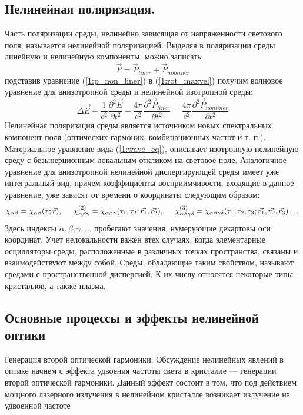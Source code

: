\subsection{Нелинейная поляризация.} 
Часть поляризации среды, нелинейно зависящая от напряженности светового поля, называется нелинейной поляризацией.
Выделяя в поляризации среды линейную и нелинейную компоненты, можно
записать:
\begin{equation}\label{1:p_non_liner}
\vec{P} = \vec{P}_{liner} + \vec{P}_{nonliner}
\end{equation}
подставив уравнение  (\ref{1:p_non_liner}) в  (\ref{1:rot_maxvel}) получим волновое уравнение для анизотропной среды и нелинейной изотропной среды:
\begin{equation}\label{1:wave_eq2}
\Delta\vec{E} - \frac{ 1 }{ c^2 }\frac{\partial^2 \vec{E} }{\partial t^2} - \frac{ 4\pi }{ c^2 }\frac{\partial^2 \vec{P}_{liner}}{\partial t^2} =  \frac{ 4\pi }{ c^2 }\frac{\partial^2 \vec{P} _{nonliner}}{\partial t^2}
\end{equation}
 Нелинейная поляризация среды является источником новых спектральных компонент поля
(оптических гармоник, комбинационных частот и т. п.). Материальное уравнение вида  (\ref{1:wave_eq}), описывает изотропную нелинейную среду с безынерционным локальным откликом на световое поле. Аналогичное
уравнение для анизотропной нелинейной диспергирующей среды имеет уже интегральный вид, причем коэффициенты восприимчивости, входящие в данное уравнение, уже зависят от времени о координаты следующим образом:
 \begin{equation}\label{1:chi}
\chi_{\alpha \beta} =  \chi_{\alpha \beta}(\tau ; \vec{r}),
\hspace{5mm}
\chi_{\alpha\beta\gamma}^{(2)}= \chi_{\alpha\beta\gamma}(\tau_{1},\tau_{2};\vec{r_{1}}, \vec{r_{2} }),
\hspace{5mm}
\chi_{\alpha\beta\gamma\delta}^{(3)} = \chi_{\alpha\beta\gamma\delta}(\tau_{1},\tau_{2},\tau_{3};\vec{r_{1}}, \vec{r_{2}}, \vec{r_{3} })
\dots
\end{equation}
Здесь индексы $\alpha, \beta, \gamma, \dots$ пробегают значения, нумерующие декартовы оси координат. Учет нелокальности важен втех случаях, когда элементарные осцилляторы среды, расположенные в различных точках пространства, связаны и взаимодействуют между собой. Среды, обладающие таким свойством, называют средами с пространственной дисперсией. К их числу относятся некоторые типы кристаллов, а также плазма.
\subsection{Основные процессы и эффекты нелинейной оптики}
Генерация второй оптической гармоники. 
Обсуждение нелинейных явлений в оптике начнем с
эффекта удвоения частоты света в кристалле — генерации второй оптической
гармоники. Данный эффект состоит в том, что под действием мощного лазерного излучения в нелинейном кристалле возникает излучение на удвоенной
частоте




